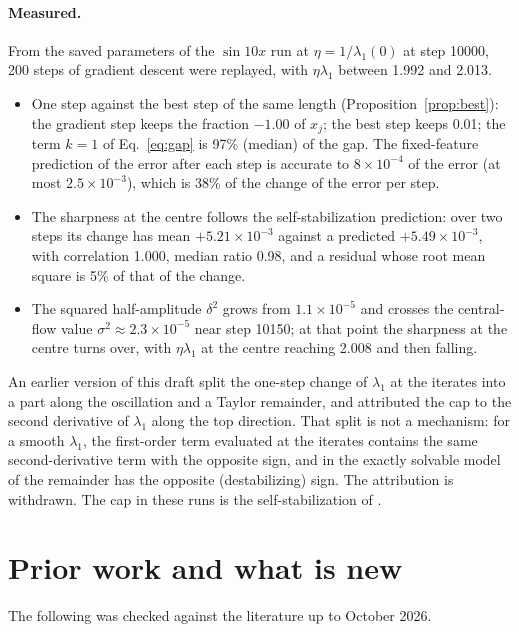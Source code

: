 \documentclass[11pt]{article}
\theoremstyle{definition}
\theoremstyle{remark}
\begin{document}
\paragraph{Measured.}
From the saved parameters of the $\sin10x$ run at $\eta = 1/\lambda_1(0)$ at step 10000, 200 steps of gradient descent were replayed, with $\eta\lambda_1$ between 1.992 and 2.013.
\begin{itemize}
\item One step against the best step of the same length (Proposition~\ref{prop:best}): the gradient step keeps the fraction $-1.00$ of $x_j$; the best step keeps 0.01; the term $k = 1$ of Eq.~\eqref{eq:gap} is 97\% (median) of the gap. The fixed-feature prediction of the error after each step is accurate to $8\times10^{-4}$ of the error (at most $2.5\times10^{-3}$), which is 38\% of the change of the error per step.
\item The sharpness at the centre follows the self-stabilization prediction: over two steps its change has mean $+5.21\times10^{-3}$ against a predicted $+5.49\times10^{-3}$, with correlation 1.000, median ratio 0.98, and a residual whose root mean square is 5\% of that of the change.
\item The squared half-amplitude $\delta^2$ grows from $1.1\times10^{-5}$ and crosses the central-flow value $\sigma^2\approx2.3\times10^{-5}$ near step 10150; at that point the sharpness at the centre turns over, with $\eta\lambda_1$ at the centre reaching 2.008 and then falling.
\end{itemize}
An earlier version of this draft split the one-step change of $\lambda_1$ at the iterates into a part along the oscillation and a Taylor remainder, and attributed the cap to the second derivative of $\lambda_1$ along the top direction. That split is not a mechanism: for a smooth $\lambda_1$, the first-order term evaluated at the iterates contains the same second-derivative term with the opposite sign, and in the exactly solvable model of \cite{lewkowycz2020} the remainder has the opposite (destabilizing) sign. The attribution is withdrawn. The cap in these runs is the self-stabilization of \cite{damian2023}.

\section{Prior work and what is new}\label{sec:prior}

The following was checked against the literature up to October 2026.
\end{document}
